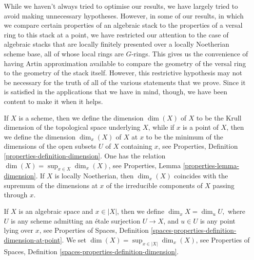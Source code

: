 \medskip\noindent
While we haven't always tried to optimise our results, we have
largely tried to avoid making unnecessary hypotheses.  However, in some
of our results, in which we compare certain properties of an algebraic
stack to the properties of a versal ring to this
stack at a point, we have restricted our attention
to the case of algebraic stacks that are locally finitely presented
over a locally Noetherian scheme base, all of whose local rings are
$G$-rings. This gives us the convenience of having Artin approximation
available to compare the geometry of the versal ring to the geometry
of the stack itself.  However, this restrictive hypothesis
may not be necessary for the truth
of all of the various statements that we prove.
Since it is satisfied in the applications that we have in mind,
though, we have been content to make it when it helps.

\medskip\noindent
If $X$ is a scheme, then we define the dimension $\dim(X)$ of $X$
to be the Krull dimension of the
topological space underlying $X$,
while if $x$ is a point of $X$,
then we define the dimension $\dim_x (X)$ of $X$ at $x$ to be the
minimum of the dimensions of the open subsets $U$ of $X$ containing
$x$, see
Properties, Definition \ref{properties-definition-dimension}.
One has the relation $\dim(X) = \sup_{x \in X} \dim_x(X)$, see
Properties, Lemma \ref{properties-lemma-dimension}.
If $X$ is locally Noetherian, then $\dim_x(X)$ coincides with the supremum
of the dimensions at $x$
of the irreducible components of $X$ passing through $x$.

\medskip\noindent
If $X$ is an algebraic space and $x \in |X|$,
then we define $\dim_x X = \dim_u U,$ where $U$ is any scheme
admitting an \'etale surjection $U \to X$,
and $u\in U$ is any point lying over $x$, see
Properties of Spaces, Definition
\ref{spaces-properties-definition-dimension-at-point}.
We set $\dim(X) = \sup_{x \in |X|} \dim_x(X)$, see
Properties of Spaces, Definition \ref{spaces-properties-definition-dimension}.


